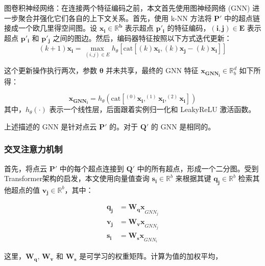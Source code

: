 图卷积神经网络：在连接两个特征编码之前，本文首先使用图神经网络 (GNN) 进一步聚合并强化它们各自的上下文关系。首先，使用 k-NN 方法将 $\boldsymbol{P'}$ 中的超点链接成一个欧几里得空间图。设 $\boldsymbol{x_i \in \mathbb{R}^b}$ 表示超点 $\boldsymbol{p'_i}$ 的特征编码，$\boldsymbol{(i, j) \in E}$ 表示超点 $\boldsymbol{p'_i}$ 和 $\boldsymbol{p'_j}$ 之间的图边。然后，编码器特征按照以下方式迭代更新：
\begin{equation}
    (k+1)\boldsymbol{x_i} = \max_{(i,j) \in E} h_{\theta} \left[ \text{cat} \left[(k)\boldsymbol{x_i}, (k)\boldsymbol{x_j} - (k)\boldsymbol{x_i} \right] \right]
\end{equation}

这个更新操作执行两次，参数 $\boldsymbol{\theta}$ 并未共享，最终的 GNN 特征 $\boldsymbol{x_{GNN_i}} \in \mathbb{R}^{d}_b$ 如下所得：

\begin{equation}
\boldsymbol{x_{GNN_i}} = h_{\theta}(\text{cat}[^{(0)}\boldsymbol{x_i}, ^{(1)}\boldsymbol{x_i}, ^{(2)}\boldsymbol{x_i}])
\end{equation}
其中，$h_{\theta}(·)$ 表示一个线性层，后面跟着实例归一化和 LeakyReLU 激活函数。

上述描述的 GNN 是针对点云 $\boldsymbol{P'}$ 的。对于 $\boldsymbol{Q'}$ 的 GNN 是相同的。

\subsubsection{交叉注意力机制}首先，将点云 $\boldsymbol{P'}$ 中的每个超点连接到 $\boldsymbol{Q'}$ 中的所有超点，形成一个二分图。受到Transformer架构的启发，本文使用向量值查询 $\boldsymbol{s_i} \in \mathbb{R}^b$ 来根据其键 $\boldsymbol{q_j} \in \mathbb{R}^b$ 检索其他超点的值 $\boldsymbol{v_j} \in \mathbb{R}^b$，其中：

\begin{equation}
\begin{aligned}
\boldsymbol{q_j} &= \boldsymbol{W_q x}_{GNN_j} \\
\boldsymbol{v_j} &= \boldsymbol{W_v x}_{GNN_j} \\
\boldsymbol{s_i} &= \boldsymbol{W_s x}_{GNN_i}
\end{aligned}
\end{equation}

这里，$\boldsymbol{W_q}$, $\boldsymbol{W_v}$ 和 $\boldsymbol{W_s}$ 是可学习的权重矩阵。计算为值的加权平均，

